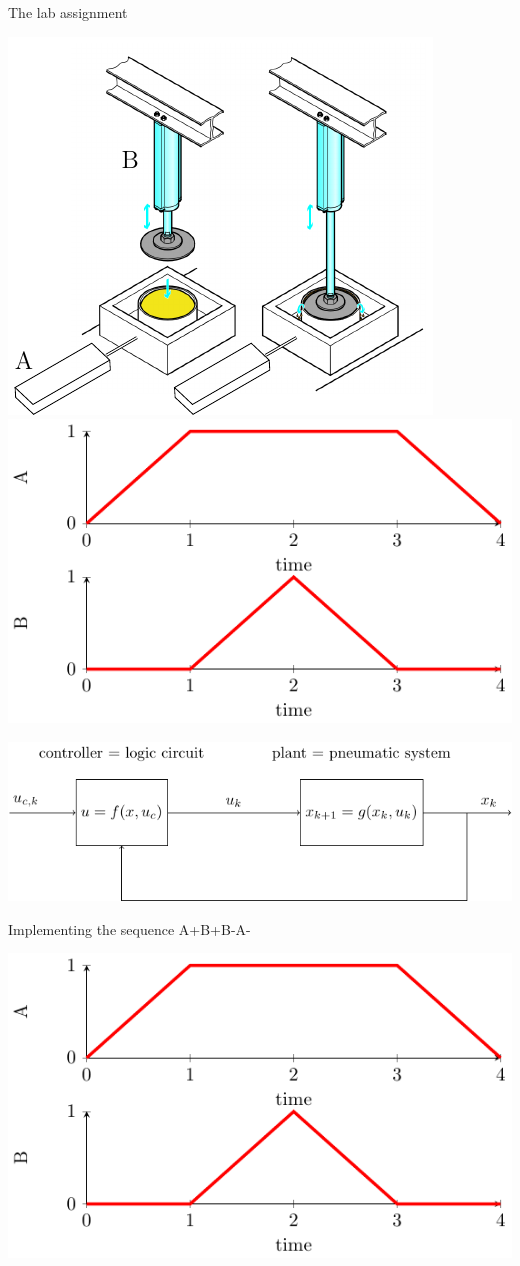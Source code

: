 \documentclass[presentation,aspectratio=1610]{beamer}
\begin{document}
\begin{frame}[label={sec:org57fecea}]{The lab assignment}
\begin{center}
\includegraphics[width=0.4\linewidth]{../../figures/cheese-pressing-two-cylinders}
 \includegraphics[width=0.58\linewidth]{../../figures/AplusBplusBminAmin}
\end{center}

\begin{center}
\includegraphics[width=0.8\linewidth]{../../figures/logic-control-loop}
\end{center}
\end{frame}

\begin{frame}[label={sec:org98b82d3}]{Implementing the sequence A+B+B-A-}
\begin{center}
\includegraphics[width=0.8\linewidth]{../../figures/AplusBplusBminAmin}
\end{center}
\end{frame}
\end{document}
